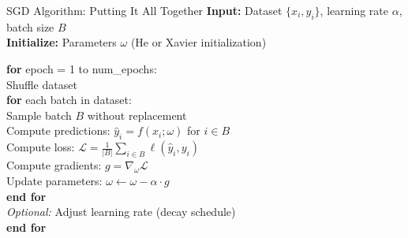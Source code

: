 \documentclass[xcolor=svgnames, 8pt, handout, standalone]{beamer}
\newcommand{\1}{\mathbf{1}}
\begin{document}
\begin{frame}{SGD Algorithm: Putting It All Together}
\textbf{Input:} Dataset $\{x_i, y_i\}$, learning rate $\alpha$, batch size $B$\\
\textbf{Initialize:} Parameters $\omega$ (He or Xavier initialization)

\vspace{0.5em}
\textbf{for} epoch = 1 to num\_epochs:\\
\hspace{1em} Shuffle dataset\\
\hspace{1em} \textbf{for} each batch in dataset:\\
\hspace{2em} Sample batch $B$ without replacement\\
\hspace{2em} Compute predictions: $\hat{y}_i = f(x_i; \omega)$ for $i \in B$\\
\hspace{2em} Compute loss: $\mathcal{L} = \frac{1}{|B|}\sum_{i \in B} \ell(\hat{y}_i, y_i)$\\
\hspace{2em} Compute gradients: $g = \nabla_\omega \mathcal{L}$\\
\hspace{2em} Update parameters: $\omega \leftarrow \omega - \alpha \cdot g$\\
\hspace{1em} \textbf{end for}\\
\hspace{1em} \textit{Optional:} Adjust learning rate (decay schedule)\\
\textbf{end for}
\end{frame}
\end{document}
